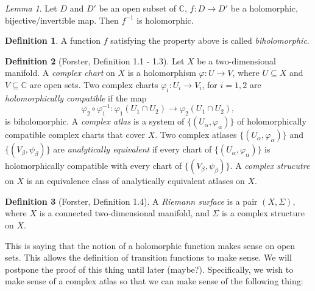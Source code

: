 \documentclass[a4paper]{report}
\theoremstyle{definition}
\newtheorem{definition}{Definition}
\theoremstyle{remark}
\theoremstyle{proposition}
\theoremstyle{conjecture}
\theoremstyle{lemma}
\newtheorem{lemma}{Lemma}
\theoremstyle{corollary}
\theoremstyle{exercise}
\theoremstyle{example}
\newcommand{\C}{\mathbb{C}}
\begin{document}
\begin{lemma}
    Let $D$ and $D'$ be an open subset of $\C$, $f : D \to D'$ be a 
    holomorphic, bijective/invertible map. Then $f^{-1}$ is holomorphic.
\end{lemma}

\begin{definition}
    A function $f$ satisfying the property above is called \emph{biholomorphic}.
\end{definition}

\begin{definition}[Forster, Definition 1.1 - 1.3]
    Let $X$ be a two-dimensional manifold. A \emph{complex chart} on $X$ 
    is a holomorphism $\varphi : U \to V$, where $U\subseteq X$ and $V\subseteq\C$
    are open sets. Two complex charts $\varphi_i : U_i \to V_i$, for $i=1,2$
    are \emph{holomorphically compatible} if the map
    $$\varphi_2 \circ \varphi_1^{-1} : \varphi_1(U_1\cap U_2) \longrightarrow \varphi_2(U_1 \cap U_2),$$
    is biholomorphic. 
    A \emph{complex atlas} is a system of $\lbrace(U_\alpha,\varphi_\alpha)\rbrace$ of holomorphically compatible complex charts that cover $X$. Two complex
    atlases $\lbrace(U_\alpha,\varphi_\alpha)\rbrace$ and $\lbrace (V_\beta,\psi_\beta)\rbrace$ are \emph{analytically equivalent} if every chart of 
    $\lbrace (U_\alpha,\varphi_\alpha)\rbrace$ is holomorphically 
    compatible with every chart of $\lbrace(V_\beta,\psi_\beta)\rbrace$. 
    A \emph{complex strucutre} on $X$ is an equivalence class of analytically equivalent atlases on $X$.
\end{definition}

\begin{definition}[Forster, Definition 1.4]
    A \emph{Riemann surface} is a pair $(X,\Sigma)$, where 
    $X$ is a connected two-dimensional manifold, and $\Sigma$ is a complex 
    structure on $X$. 
\end{definition}

This is saying that the notion of a holomorphic function makes sense on 
open sets. This allows the definition of transition functions to make sense.
We will postpone the proof of this thing until later (maybe?).
Specifically, we wish to make sense of a complex atlas so that we can 
make sense of the following thing:
\end{document}
